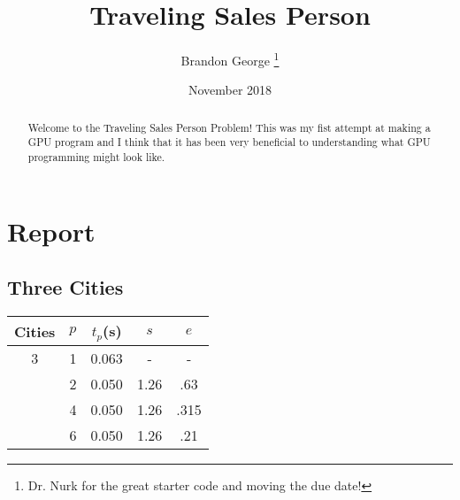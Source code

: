 \documentclass[12pt, letterpaper]{article}
\title{Traveling Sales Person}
\author{Brandon George \thanks{Dr. Nurk for the great starter code and moving the due date!}}
\date{November 2018}
\begin{document}
\begin{titlepage}
\maketitle
\end{titlepage}

\begin{abstract}
Welcome to the Traveling Sales Person Problem! This was my fist attempt at making a GPU program and I think that it has been very beneficial to understanding what GPU programming might look like.
\end{abstract}

\section{Report}

\subsection{Three Cities}
\begin{center}
  \begin{tabular}{|c | c c c c ||}
    \hline
    Cities & $p$ & $t_p$(s) & $s$ & $e$ \\
    \hline\hline
      3 & 1 & 0.063 & - & - \\
       & 2 & 0.050 & 1.26 & .63 \\
       & 4 & 0.050 & 1.26 & .315 \\
       & 6 & 0.050 & 1.26 & .21 \\
      \hline\hline
      \hline
  \end{tabular}
\end{center}
\end{document}
